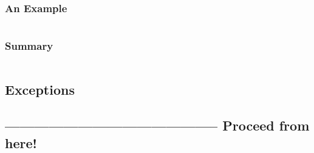 \documentclass[11pt,a4paper, titlepage, parskip=half, headsepline, footsepline, cleardoublepage=current, headheight=1cm]{scrbook}
\begin{document}
\begin{lstlisting}
\end{lstlisting}

\begin{lstlisting}
\end{lstlisting}

\begin{lstlisting}
\end{lstlisting}

\begin{lstlisting}
\end{lstlisting}

\begin{lstlisting}
\end{lstlisting}

\begin{lstlisting}
\end{lstlisting}

\begin{lstlisting}
\end{lstlisting}

\subsubsection{An  Example}
\begin{lstlisting}
\end{lstlisting}

\lipsum[1]

\subsubsection{Summary}
\begin{lstlisting}
\end{lstlisting}

\lipsum[1]

\subsection{Exceptions}
\subsection{-------------------------------------------- Proceed from here!}

\begin{lstlisting}
\end{lstlisting}

\lipsum[1]
\end{document}
